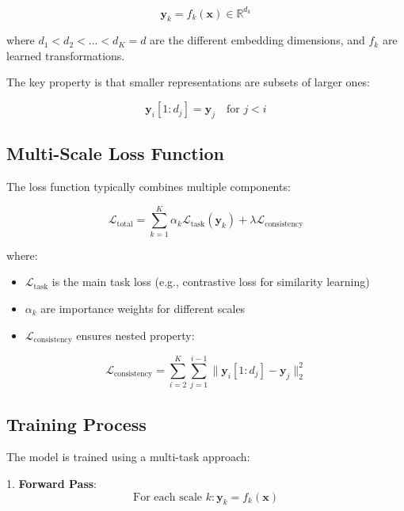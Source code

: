 \begin{equation}
    \mathbf{y}_k = f_k(\mathbf{x}) \in \mathbb{R}^{d_k}
\end{equation}

where $d_1 < d_2 < ... < d_K = d$ are the different embedding dimensions, and $f_k$ are learned transformations.

The key property is that smaller representations are subsets of larger ones:

\begin{equation}
    \mathbf{y}_i[1:d_j] = \mathbf{y}_j \quad \text{for } j < i
\end{equation}

\subsection{Multi-Scale Loss Function}

The loss function typically combines multiple components:

\begin{equation}
    \mathcal{L}_{\text{total}} = \sum_{k=1}^K \alpha_k \mathcal{L}_{\text{task}}(\mathbf{y}_k) + \lambda \mathcal{L}_{\text{consistency}}
\end{equation}

where:
\begin{itemize}
    \item $\mathcal{L}_{\text{task}}$ is the main task loss (e.g., contrastive loss for similarity learning)
    \item $\alpha_k$ are importance weights for different scales
    \item $\mathcal{L}_{\text{consistency}}$ ensures nested property:
\end{itemize}

\begin{equation}
    \mathcal{L}_{\text{consistency}} = \sum_{i=2}^K \sum_{j=1}^{i-1} \|\mathbf{y}_i[1:d_j] - \mathbf{y}_j\|_2^2
\end{equation}

\subsection{Training Process}

The model is trained using a multi-task approach:

1. \textbf{Forward Pass}:
   \begin{equation}
       \text{For each scale } k: \mathbf{y}_k = f_k(\mathbf{x})
   \end{equation}

